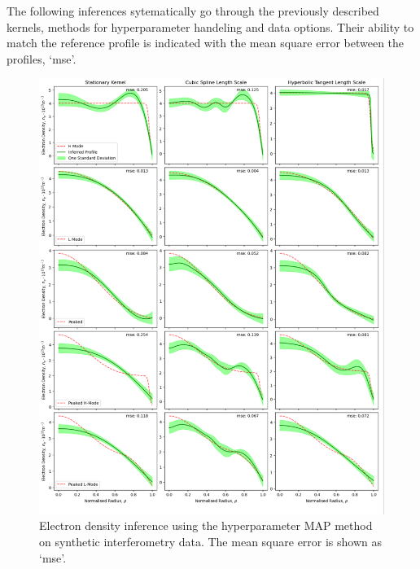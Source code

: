 The following inferences sytematically go through the previously described kernels, methods for hyperparameter handeling and data options. Their ability to match the reference profile is indicated with the mean square error between the profiles, `mse'.


\begin{figure}[H]
    \centering
    \includegraphics[width=\textwidth]{images/Final/MAPsynthetic_final_all.png}
    \caption{Electron density inference using the hyperparameter MAP method on synthetic interferometry data. The mean square error is shown as `mse'.}
    \label{fig:mapsynthetic}
\end{figure}


